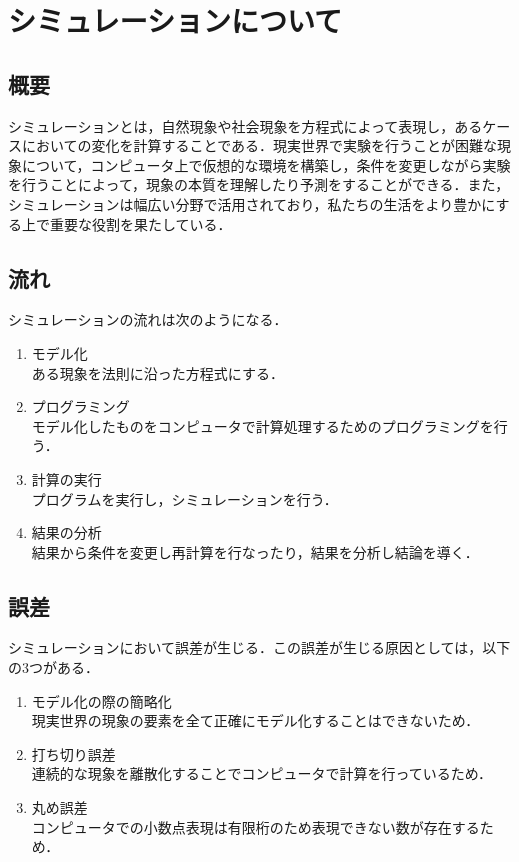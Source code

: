 \documentclass[a4paper, 12pt]{ltjsarticle}
\begin{document}
\section{シミュレーションについて}
\subsection{概要}
シミュレーションとは，自然現象や社会現象を方程式によって表現し，あるケースにおいての変化を計算することである．現実世界で実験を行うことが困難な現象について，コンピュータ上で仮想的な環境を構築し，条件を変更しながら実験を行うことによって，現象の本質を理解したり予測をすることができる．また，シミュレーションは幅広い分野で活用されており，私たちの生活をより豊かにする上で重要な役割を果たしている．
\subsection{流れ}
シミュレーションの流れは次のようになる．
\begin{enumerate}
\item モデル化\\
ある現象を法則に沿った方程式にする．
\item プログラミング\\
モデル化したものをコンピュータで計算処理するためのプログラミングを行う．
\item 計算の実行\\
プログラムを実行し，シミュレーションを行う．
\item 結果の分析\\
結果から条件を変更し再計算を行なったり，結果を分析し結論を導く．
\end{enumerate}
\subsection{誤差}
シミュレーションにおいて誤差が生じる．この誤差が生じる原因としては，以下の3つがある．
\begin{enumerate}
\item モデル化の際の簡略化\\
現実世界の現象の要素を全て正確にモデル化することはできないため．
\item 打ち切り誤差\\
連続的な現象を離散化することでコンピュータで計算を行っているため．
\item 丸め誤差\\
コンピュータでの小数点表現は有限桁のため表現できない数が存在するため．
\end{enumerate}
\end{document}
